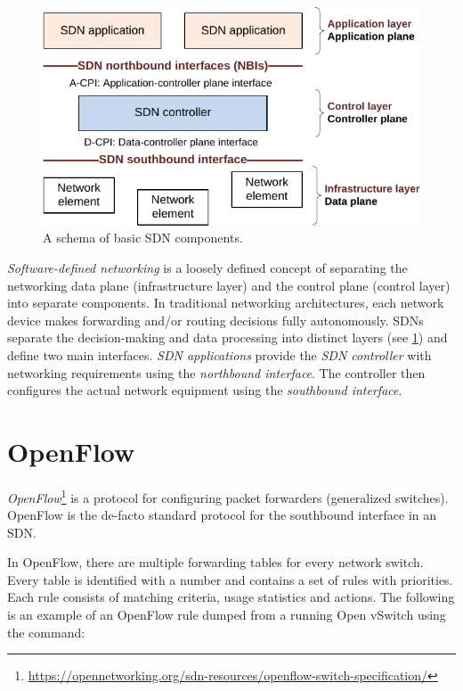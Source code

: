 
\begin{figure}
    \centering
    \includegraphics[width=.6\linewidth]{img/sdn_basic_schema.pdf}
    \caption{A schema of basic SDN components.}
    \label{fig:sdn-schema}
\end{figure}

\emph{Software-defined networking} is a loosely defined concept of separating the networking data plane (infrastructure layer) and the control plane (control layer) into separate components. In traditional networking architectures, each network device makes forwarding and/or routing decisions fully autonomously. SDNs separate the decision-making and data processing into distinct layers (see \cref{fig:sdn-schema}) and define two main interfaces. \emph{SDN applications} provide the \emph{SDN controller} with networking requirements using the \emph{northbound interface}. The controller then configures the actual network equipment using the \emph{southbound interface}.

\section{OpenFlow}
\label{sec:openflow}

\emph{OpenFlow}\footnote{\url{https://opennetworking.org/sdn-resources/openflow-switch-specification/}} is a protocol for configuring packet forwarders (generalized switches). OpenFlow is the de-facto standard protocol for the southbound interface in an SDN.

In OpenFlow, there are multiple forwarding tables for every network switch. Every table is identified with a number and contains a set of rules with priorities. Each rule consists of matching criteria, usage statistics and actions. The following is an example of an OpenFlow rule dumped from a running Open vSwitch using the  command:

